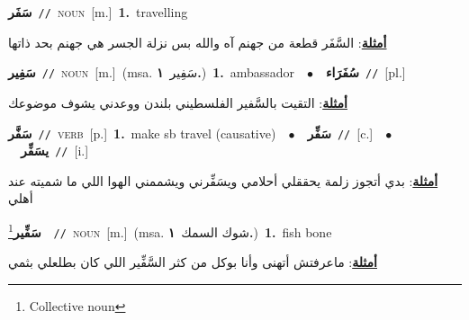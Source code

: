 \documentclass[10pt,a4paper,twoside]{article} %
\begin{document}
\begin{multicols}{2}
{\setlength\topsep{0pt}\textbf{\foreignlanguage{arabic}{سَفَر}}\ {\color{gray}\texttt{//}\color{black}}\ \textsc{noun}\ [m.]\ \textbf{1.}~travelling\  \begin{flushright}\color{gray}\foreignlanguage{arabic}{\textbf{\underline{\foreignlanguage{arabic}{أمثلة}}}: السَّفَر قطعة من جهنم آه والله بس نزلة الجسر هي جهنم بحد ذاتها}\end{flushright}\color{black}} \vspace{2mm}

{\setlength\topsep{0pt}\textbf{\foreignlanguage{arabic}{سَفِير}}\ {\color{gray}\texttt{//}\color{black}}\ \textsc{noun}\ [m.]\ \color{gray}(msa. \foreignlanguage{arabic}{سَفِير}~\foreignlanguage{arabic}{\textbf{١.}})\color{black}\ \textbf{1.}~ambassador\ \ $\bullet$\ \ \setlength\topsep{0pt}\textbf{\foreignlanguage{arabic}{سُفَرَاء}}\ {\color{gray}\texttt{//}\color{black}}\ [pl.]\  \begin{flushright}\color{gray}\foreignlanguage{arabic}{\textbf{\underline{\foreignlanguage{arabic}{أمثلة}}}: التقيت بالسَّفير الفلسطيني بلندن ووعدني يشوف موضوعك}\end{flushright}\color{black}} \vspace{2mm}

{\setlength\topsep{0pt}\textbf{\foreignlanguage{arabic}{سَفَّر}}\ {\color{gray}\texttt{//}\color{black}}\ \textsc{verb}\ [p.]\ \textbf{1.}~make sb travel (causative)\ \ $\bullet$\ \ \setlength\topsep{0pt}\textbf{\foreignlanguage{arabic}{سَفِّر}}\ {\color{gray}\texttt{//}\color{black}}\ [c.]\ \ $\bullet$\ \ \setlength\topsep{0pt}\textbf{\foreignlanguage{arabic}{يسَفِّر}}\ {\color{gray}\texttt{//}\color{black}}\ [i.]\  \begin{flushright}\color{gray}\foreignlanguage{arabic}{\textbf{\underline{\foreignlanguage{arabic}{أمثلة}}}: بدي أتجوز زلمة يحققلي أحلامي ويسَفِّرني ويشممني الهوا اللي ما شميته عند أهلي}\end{flushright}\color{black}} \vspace{2mm}

{\setlength\topsep{0pt}\textbf{\foreignlanguage{arabic}{سَفِّير}}\footnote{Collective noun}\ \ {\color{gray}\texttt{//}\color{black}}\ \textsc{noun}\ [m.]\ \color{gray}(msa. \foreignlanguage{arabic}{شوك السمك}~\foreignlanguage{arabic}{\textbf{١.}})\color{black}\ \textbf{1.}~fish bone\  \begin{flushright}\color{gray}\foreignlanguage{arabic}{\textbf{\underline{\foreignlanguage{arabic}{أمثلة}}}: ماعرفتش أتهنى وأنا بوكل من كثر السَّفِّير اللي كان بطلعلي بثمي}\end{flushright}\color{black}} \vspace{2mm}


\end{multicols}
\end{document}
